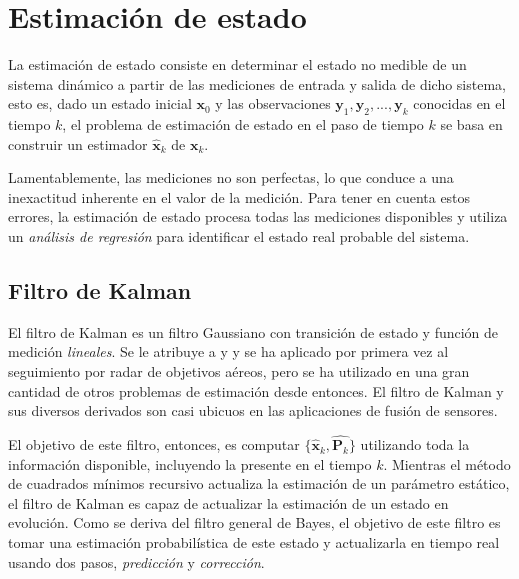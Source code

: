 \section{Estimación de estado}
La estimación de estado consiste en determinar el estado no medible de un sistema dinámico a partir de las mediciones de entrada y salida de dicho sistema, esto es, dado un estado inicial $\bm{x}_0$ y las observaciones $\bm{y}_1, \bm{y}_2, ..., \bm{y}_k$ conocidas en el tiempo $k$, el problema de estimación de estado en el paso de tiempo $k$ se basa en construir un estimador $\hat{\bm{x}}_k$ de $\bm{x}_k$.

Lamentablemente, las mediciones no son perfectas, lo que conduce a una inexactitud inherente en el valor de la medición. Para tener en cuenta estos errores, la estimación de estado procesa todas las mediciones disponibles y utiliza un \textit{análisis de regresión} para identificar el estado real probable del sistema.

\subsection{Filtro de Kalman}
El filtro de Kalman es un filtro Gaussiano con transición de estado y función de medición \textit{lineales}. Se le atribuye a {} y {} y se ha aplicado por primera vez al seguimiento por radar de objetivos aéreos, pero se ha utilizado en una gran cantidad de otros problemas de estimación desde entonces. El filtro de Kalman y sus diversos derivados son casi ubicuos en las aplicaciones de fusión de sensores.

El objetivo de este filtro, entonces, es computar $\{\hat{\bm{x}}_k,\hat{\bm{P}_k}\}$ utilizando toda la información disponible, incluyendo la presente en el tiempo $k$. Mientras el método de cuadrados mínimos recursivo actualiza la estimación de un parámetro estático, el filtro de Kalman es capaz de actualizar la estimación de un estado en evolución. Como se deriva del filtro general de Bayes{}, el objetivo de este filtro es tomar una estimación probabilística de este estado y actualizarla en tiempo real usando dos pasos, \textit{predicción} y \textit{corrección}.

